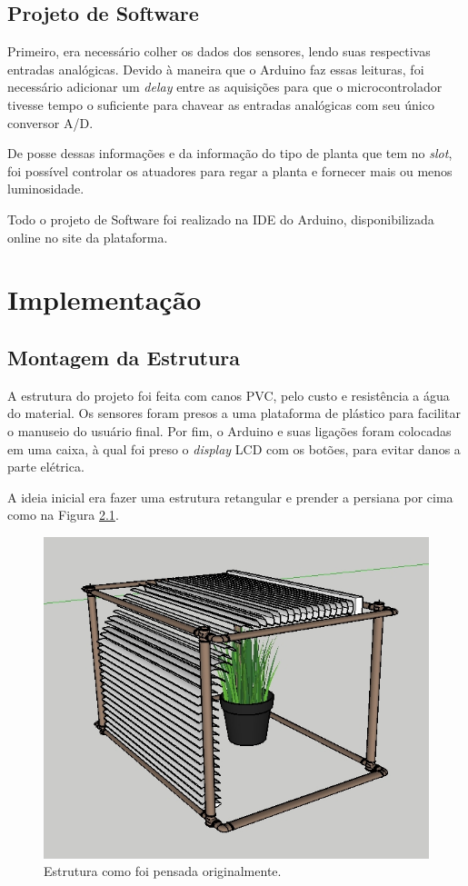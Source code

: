 \documentclass[a4paper,12pt]{report}
\begin{document}
	\section{Projeto de Software}
	Primeiro, era necessário colher os dados dos sensores, lendo suas respectivas entradas analógicas. Devido à maneira que o Arduino faz essas leituras, foi necessário adicionar um \textit{delay} entre as aquisições para que o microcontrolador tivesse tempo o suficiente para chavear as entradas analógicas com seu único conversor A/D.
	
	De posse dessas informações e da informação do tipo de planta que tem no \textit{slot}, foi possível controlar os atuadores para regar a planta e fornecer mais ou menos luminosidade.
	
	Todo o projeto de Software foi realizado na IDE do Arduino, disponibilizada online no site da plataforma.
	

\cleardoublepage
\chapter{Implementação}
	\label{cap:Implementacao}

\section{Montagem da Estrutura}
	\label{sec:montagem}
	A estrutura do projeto foi feita com canos PVC, pelo custo e resistência a água do material. Os sensores foram presos a uma plataforma de plástico para facilitar o manuseio do usuário final. Por fim, o Arduino e suas ligações foram colocadas em uma caixa, à qual foi preso o \textit{display} LCD com os botões, para evitar danos a parte elétrica.
	
	A ideia inicial era fazer uma estrutura retangular e prender a persiana por cima como na Figura \ref{fig:estru0}.
	
	\begin{figure}[!h]
	\centering
	\includegraphics[width=0.7\linewidth]{figs/estru0}
	\caption{Estrutura como foi pensada originalmente.}
	\label{fig:estru0}
	\end{figure}
\end{document}
